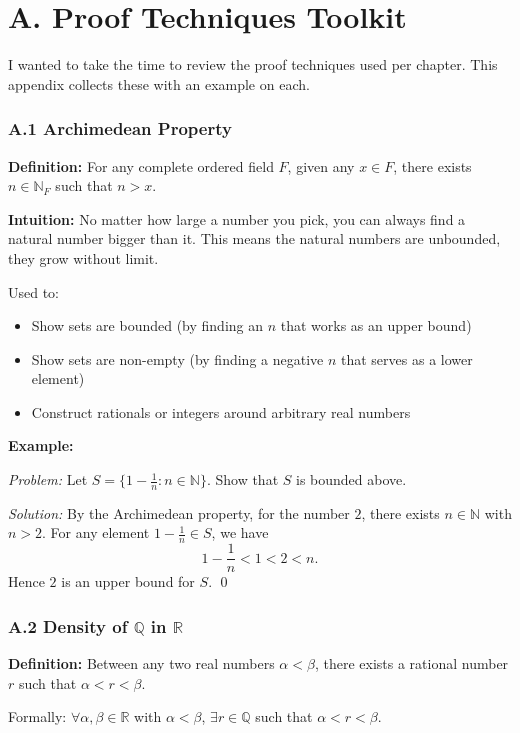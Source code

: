 \newpage
\section*{A. Proof Techniques Toolkit}

I wanted to take the time to review the proof techniques used per chapter. This appendix collects these with an example on each.

\subsubsection*{A.1 Archimedean Property}

\textbf{Definition:}
For any complete ordered field $F$, given any $x \in F$, there exists $n \in \mathbb{N}_F$ such that $n > x$.

\textbf{Intuition:}
No matter how large a number you pick, you can always find a natural number bigger than it. This means the natural numbers are unbounded, they grow without limit.

Used to:
\begin{itemize}
    \item Show sets are bounded (by finding an $n$ that works as an upper bound)
    \item Show sets are non-empty (by finding a negative $n$ that serves as a lower element)
    \item Construct rationals or integers around arbitrary real numbers
\end{itemize}

\textbf{Example:}

\textit{Problem:} Let $S = \{1 - \frac{1}{n} : n \in \mathbb{N}\}$. Show that $S$ is bounded above.

\textit{Solution:} By the Archimedean property, for the number $2$, there exists $n \in \mathbb{N}$ with $n > 2$. For any element $1 - \frac{1}{n} \in S$, we have 
\[1 - \frac{1}{n} < 1 < 2 < n.\]
Hence $2$ is an upper bound for $S$. \qed

\subsubsection*{A.2 Density of $\mathbb{Q}$ in $\mathbb{R}$}

\textbf{Definition:}
Between any two real numbers $\alpha < \beta$, there exists a rational number $r$ such that $\alpha < r < \beta$.

Formally: $\forall \alpha, \beta \in \mathbb{R}$ with $\alpha < \beta$, $\exists r \in \mathbb{Q}$ such that $\alpha < r < \beta$.

